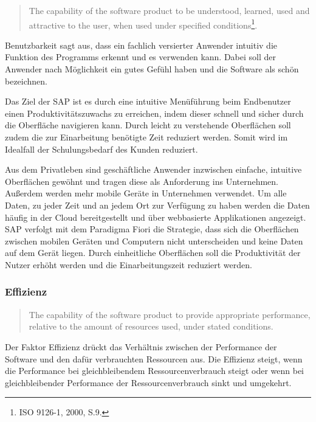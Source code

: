             \begin{quote}
              The capability of the software product to be understood, learned, used and attractive to the user, when used under specified conditions\footnote{ISO 9126-1, 2000, S.9.}.
            \end{quote}

            Benutzbarkeit sagt aus, dass ein fachlich versierter Anwender intuitiv die Funktion des Programms erkennt und es verwenden kann. Dabei soll der Anwender nach Möglichkeit ein gutes Gefühl haben und die Software als schön bezeichnen.

            Das Ziel der SAP ist es durch eine intuitive Menüführung beim Endbenutzer einen Produktivitätszuwachs zu erreichen, indem dieser schnell und sicher durch die Oberfläche navigieren kann. Durch leicht zu verstehende Oberflächen soll zudem die zur Einarbeitung benötigte Zeit reduziert werden. Somit wird im Idealfall der Schulungsbedarf des Kunden reduziert.

            Aus dem Privatleben sind geschäftliche Anwender inzwischen einfache, intuitive Oberflächen gewöhnt und tragen diese als Anforderung ins Unternehmen. Außerdem werden mehr mobile Geräte in Unternehmen verwendet. Um alle Daten, zu jeder Zeit und an jedem Ort zur Verfügung zu haben werden die Daten häufig in der Cloud bereitgestellt und über webbasierte Applikationen angezeigt. SAP verfolgt mit dem Paradigma Fiori die Strategie, dass sich die Oberflächen zwischen mobilen Geräten und Computern nicht unterscheiden und keine Daten auf dem Gerät liegen. Durch einheitliche Oberflächen soll die Produktivität der Nutzer erhöht werden und die Einarbeitungszeit reduziert werden.

        \subsubsection{Effizienz}

            \begin{quote}
              The capability of the software product to provide appropriate performance, relative to the amount of resources used, under stated conditions.
            \end{quote}

            Der Faktor Effizienz drückt das Verhältnis zwischen der Performance der Software und den dafür verbrauchten Ressourcen aus. Die Effizienz steigt, wenn die Performance bei gleichbleibendem Ressourcenverbrauch steigt oder wenn bei gleichbleibender Performance der Ressourcenverbrauch sinkt und umgekehrt.

